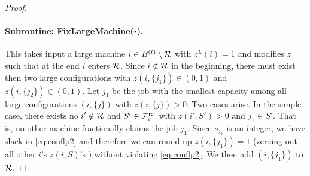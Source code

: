 \documentclass{article}[11pt]
\newcommand{\brt}{{(t)}}
\begin{document}
\begin{proof}
%	
%	
	
%	
	
	
%	
%	
\paragraph{Subroutine: {\sf FixLargeMachine}($i$).}
This takes input a large machine $i\in B^\brt\setminus \calR$ with  $z^L(i) = 1$ and modifies $z$ such that  at the end $i$ enters  ${\cal R}$.
Since $i\notin {\cal R}$ in the beginning, there must exist then two large configurations with $z(i,\{j_1\}) \in (0,1)$ and $z(i,\{j_2\}) \in (0,1)$. 
	Let $j_1$ be the job with the smallest capacity among all large configurations $(i,\{j\})$ with $z(i,\{j\}) > 0$.
	Two cases arise. In the simple case, there exists no $i'\notin {\cal R}$ and $S'\in {\cal F}^{\mathsf{rel}}_{i'}$ with $z(i',S') > 0$ and $j_1 \in S'$. That is, no other machine fractionally claims the job $j_1$.
	Since $s_{j_1}$ is an integer, we have slack in \eqref{eq:conflp2} and therefore we can round up $z(i,\{j_1\}) = 1$ (zeroing out all other $i$'s $z(i,S)$'s ) without violating \eqref{eq:conflp2}. We then  add $(i,\{j_1\})$ to ${\cal R}$.
	

\end{proof}
\end{document}
